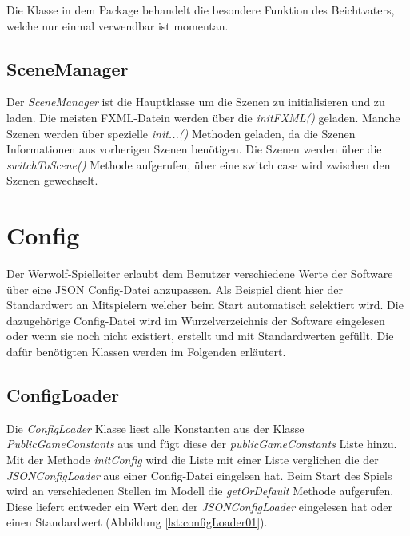 Die Klasse in dem Package behandelt die besondere Funktion des Beichtvaters, welche nur einmal verwendbar ist momentan.

\subsection{SceneManager}

Der \textit{SceneManager} ist die Hauptklasse um die Szenen zu initialisieren und zu laden. Die meisten FXML-Datein werden über die \textit{initFXML()} geladen. Manche Szenen werden über spezielle \textit{init...()} Methoden geladen, da die Szenen Informationen aus vorherigen Szenen benötigen. Die Szenen werden über die \textit{switchToScene()} Methode aufgerufen, über eine switch case wird zwischen den Szenen gewechselt. 

\section{Config}

Der Werwolf-Spielleiter erlaubt dem Benutzer verschiedene Werte der Software über eine JSON Config-Datei anzupassen. Als Beispiel dient hier der Standardwert an Mitspielern welcher beim Start automatisch selektiert wird. Die dazugehörige Config-Datei wird im Wurzelverzeichnis der Software eingelesen oder wenn sie noch nicht existiert, erstellt und mit Standardwerten gefüllt. Die dafür benötigten Klassen werden im Folgenden erläutert.

\subsection{ConfigLoader}

Die \textit{ConfigLoader} Klasse liest alle Konstanten aus der Klasse \textit{PublicGameConstants} aus und fügt diese der \textit{publicGameConstants} Liste hinzu. Mit der Methode \textit{initConfig} wird die Liste mit einer Liste verglichen die der \textit{JSONConfigLoader} aus einer Config-Datei eingelsen hat. Beim Start des Spiels wird an verschiedenen Stellen im Modell die \textit{getOrDefault} Methode aufgerufen. Diese liefert entweder ein Wert den der \textit{JSONConfigLoader} eingelesen hat oder einen Standardwert (Abbildung \ref{lst:configLoader01}).

\medskip
\begin{center}
	\begin{minipage}{0.95\textwidth}
		
	\end{minipage}
\end{center}

